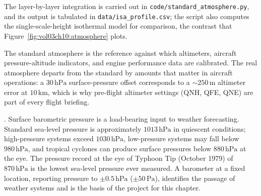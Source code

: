 

The layer-by-layer integration is carried out in
\texttt{code/standard\_atmosphere.py}, and its output is tabulated in
\texttt{data/isa\_profile.csv}; the script also computes the
single-scale-height isothermal model for comparison, the contrast that
Figure~\ref{fig:vol03ch10:atmosphere} plots.

The standard atmosphere is the reference against which altimeters,
aircraft pressure-altitude indicators, and engine performance
data are calibrated. The real atmosphere departs from the
standard by amounts that matter in aircraft operations: a
$30\,\text{hPa}$ surface-pressure offset corresponds to a
$\sim 250\,\si{\meter}$ altimeter error at $10\,\si{\kilo\meter}$,
which is why pre-flight altimeter settings (QNH, QFE, QNE) are
part of every flight briefing.

. Surface barometric
pressure is a load-bearing input to weather forecasting. Standard
sea-level pressure is approximately $1013\,\text{hPa}$ in
quiescent conditions; high-pressure systems exceed $1030\,\text{
hPa}$, low-pressure systems may fall below $980\,\text{hPa}$, and
tropical cyclones can produce surface pressures below $880\,\text
{hPa}$ at the eye. The pressure record at the eye of Typhoon Tip
(October 1979) of $870\,\text{hPa}$ is the lowest sea-level
pressure ever measured. A barometer at a fixed location,
reporting pressure to $\pm 0.5\,\text{hPa}$ ($\pm 50\,\text{Pa}$),
identifies the passage of weather systems and is the basis of
the project for this chapter.

